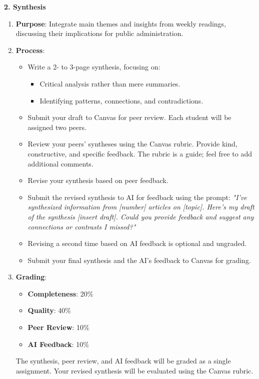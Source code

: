 \documentclass[12pt, letterpaper]{article}
\begin{document}
\textbf{2. Synthesis}

\begin{enumerate}
    \item \textbf{Purpose}: Integrate main themes and insights from weekly readings, discussing their implications for public administration.
    \item \textbf{Process}:
    \begin{itemize}
        \item Write a 2- to 3-page synthesis, focusing on:
        \begin{itemize}
            \item Critical analysis rather than mere summaries.
            \item Identifying patterns, connections, and contradictions.
        \end{itemize}
        \item Submit your draft to Canvas for peer review. Each student will be assigned two peers.
        \item Review your peers' syntheses using the Canvas rubric. Provide kind, constructive, and specific feedback. The rubric is a guide; feel free to add additional comments.
        \item Revise your synthesis based on peer feedback.
        \item Submit the revised synthesis to AI for feedback using the prompt:
        \textit{"I've synthesized information from [number] articles on [topic]. Here's my draft of the synthesis [insert draft]. Could you provide feedback and suggest any connections or contrasts I missed?"}
        \item Revising a second time based on AI feedback is optional and ungraded.
        \item Submit your final synthesis and the AI's feedback to Canvas for grading.
    \end{itemize}
    \item \textbf{Grading}:
    \begin{itemize}
        \item \textbf{Completeness}: 20\%
        \item \textbf{Quality}: 40\%
        \item \textbf{Peer Review}: 10\%
        \item \textbf{AI Feedback}: 10\%
    \end{itemize}
    The synthesis, peer review, and AI feedback will be graded as a single assignment. Your revised synthesis will be evaluated using the Canvas rubric.
\end{enumerate}
\end{document}
